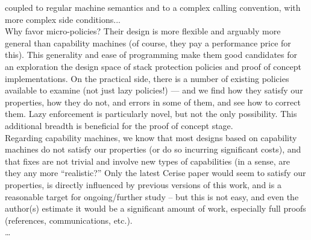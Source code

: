 {coupled to regular machine semantics and to a complex calling convention, with
more complex side conditions...
%
\\
%
Why favor micro-policies? Their design is more flexible and arguably more
general than capability machines (of course, they pay a performance price for
this). This generality and ease of programming make them good candidates for an
exploration the design space of stack protection policies and proof of concept
implementations. On the practical side, there is a number of existing policies
available to examine (not just lazy policies!) --- and we find how they satisfy
our properties, how they do not, and errors in some of them, and see how to
correct them. Lazy enforcement is particularly novel, but not the only
possibility. This additional breadth is beneficial for the proof of concept
stage.
%
\\
%
Regarding capability machines, we know that most designs based on capability
machines do not satisfy our properties (or do so incurring significant costs),
and that fixes are not trivial and involve new types of capabilities (in a
sense, are they any more ``realistic?'' Only the latest Cerise paper would seem
to satisfy our properties, is directly influenced by previous versions of this
work, and is a reasonable target for ongoing/further study -- but this is not
easy, and even the author(s) estimate it would be a significant amount of work,
especially full proofs (references, communications, etc.).
%
\\
%
\ldots
%
}




